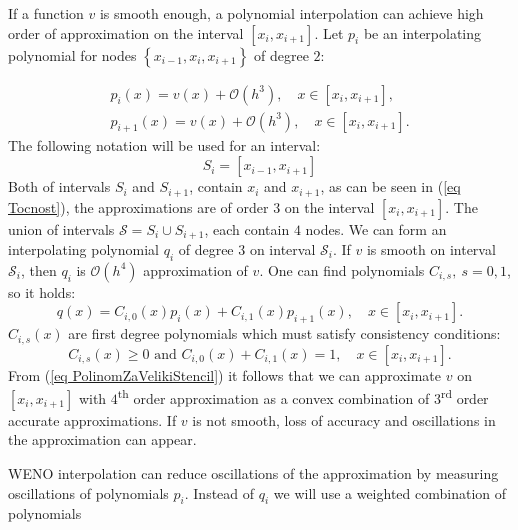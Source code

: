 	If a function $v$ is smooth enough, a polynomial interpolation can achieve high order of approximation on the interval $[x_i,x_{i+1}]$. 
	Let $p_i$ be an interpolating polynomial for nodes $\left\{x_{i-1},x_{i},x_{i+1}\right\}$ of degree  $2$:
	
	\begin{equation}\label{eq Tocnost}
	\begin{aligned}
		p_i(x)=v(x)+\mathcal{O}(h^{3}), \quad x \in [x_i,x_{i+1}],\\
		p_{i+1}(x)=v(x)+\mathcal{O}(h^{3}), \quad x \in [x_i,x_{i+1}].
	\end{aligned}
	\end{equation}
	 The following notation will be used for an interval: 
	\begin{equation}\label{eq Stencil}
		S_{i}=\left[x_{i-1},x_{i+1}\right]
	\end{equation}
	Both of intervals $S_i$ and $S_{i+1}$, contain $x_i$ and $x_{i+1}$, as can be seen in (\ref{eq Tocnost}), the approximations are of order $3$ on the interval $[x_i,x_{i+1}]$.
	The union of intervals $\mathcal{S}=S_i\cup S_{i+1}$, each contain $4$ nodes.
	 We can form an interpolating polynomial $q_i$ of degree $3$ on interval $\mathcal{S}_i$. If $v$ is smooth on interval $\mathcal{S}_i$,
	then $q_i$ is $\mathcal{O}(h^4)$ approximation of $v$. One can find polynomials  $C_{i,s},\ s=0,1$, so it holds:
	\begin{equation}\label{eq PolinomZaVelikiStencil}
		q(x)=
		C_{i,0}(x) p_i(x)+C_{i,1}(x) p_{i+1}(x), \quad x \in [x_i,x_{i+1}].
	\end{equation}
	$C_{i,s}(x)$ are first degree polynomials  %
	which must satisfy consistency conditions: 
	$$C_{i,s}(x) \geq 0\textrm{ and } C_{i,0}(x)+C_{i,1}(x)=1, \quad  x \in [x_{i},x_{i+1}].$$
	From (\ref{eq PolinomZaVelikiStencil}) it follows that %
	we can approximate $v$ on $[x_i,x_{i+1}]$ with $4$\textsuperscript{th} order approximation as a convex combination of $3$\textsuperscript{rd} order accurate approximations. If $v$ is not smooth, loss of accuracy and oscillations in the approximation can appear.
	
	WENO interpolation can reduce oscillations of the approximation by measuring oscillations of polynomials $p_i$.
	Instead of  $q_i$ we will use a weighted combination of polynomials 
	
